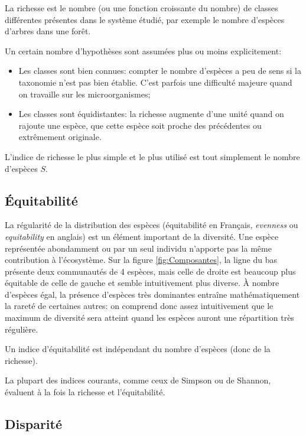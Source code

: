 \documentclass[
  11pt,
  french,
  a4paper,
  extrafontsizes,onecolumn,openright
  ]{memoir}
\providecommand{\tightlist}{%
  \setlength{\itemsep}{0pt}\setlength{\parskip}{0pt}}
\newlength{\rf}
\begin{document}
La richesse \autocite[terme introduit par][]{Mcintosh1967} est le nombre (ou une fonction croissante du nombre) de classes différentes présentes dans le système étudié, par exemple le nombre d'espèces d'arbres dans une forêt.

Un certain nombre d'hypothèses sont assumées plus ou moins explicitement:

\begin{itemize}
\tightlist
\item
  Les classes sont bien connues: compter le nombre d'espèces a peu de sens si la taxonomie n'est pas bien établie.
  C'est parfois une difficulté majeure quand on travaille sur les microorganismes;
\item
  Les classes sont équidistantes: la richesse augmente d'une unité quand on rajoute une espèce, que cette espèce soit proche des précédentes ou extrêmement originale.
\end{itemize}

L'indice de richesse le plus simple et le plus utilisé est tout simplement le nombre d'espèces \(S\).

\hypertarget{uxe9quitabilituxe9}{%
\subsection{Équitabilité}\label{uxe9quitabilituxe9}}

La régularité de la distribution des espèces (équitabilité en Français, \emph{evenness} ou \emph{equitability} en anglais) est un élément important de la diversité.
Une espèce représentée abondamment ou par un seul individu n'apporte pas la même contribution à l'écosystème.
Sur la figure \ref{fig:Composantes}, la ligne du bas présente deux communautés de 4 espèces, mais celle de droite est beaucoup plus équitable de celle de gauche et semble intuitivement plus diverse.
À nombre d'espèces égal, la présence d'espèces très dominantes entraîne mathématiquement la rareté de certaines autres: on comprend donc assez intuitivement que le maximum de diversité sera atteint quand les espèces auront une répartition très régulière.

Un indice d'équitabilité est indépendant du nombre d'espèces (donc de la richesse).

La plupart des indices courants, comme ceux de Simpson ou de Shannon, évaluent à la fois la richesse et l'équitabilité.

\hypertarget{disparituxe9}{%
\subsection{Disparité}\label{disparituxe9}}
\end{document}
